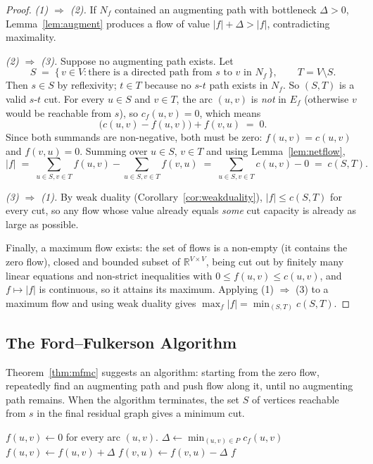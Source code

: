 \documentclass{article}
\theoremstyle{definition}
\begin{document}
\begin{proof}
\emph{(1) $\Rightarrow$ (2).} If $N_f$ contained an augmenting path
with bottleneck $\Delta > 0$, Lemma~\ref{lem:augment} produces a flow
of value $|f| + \Delta > |f|$, contradicting maximality.

\emph{(2) $\Rightarrow$ (3).} Suppose no augmenting path exists. Let
\[
  S \;=\; \{\, v \in V : \text{there is a directed path from } s \text{ to } v \text{ in } N_f \,\},
  \qquad T = V \setminus S.
\]
Then $s \in S$ by reflexivity; $t \in T$ because no $s$-$t$ path
exists in $N_f$. So $(S, T)$ is a valid $s$-$t$ cut. For every
$u \in S$ and $v \in T$, the arc $(u, v)$ is \emph{not} in $E_f$
(otherwise $v$ would be reachable from $s$), so $c_f(u, v) = 0$,
which means
\[
  \big(c(u, v) - f(u, v)\big) + f(v, u) \;=\; 0.
\]
Since both summands are non-negative, both must be zero:
$f(u, v) = c(u, v)$ and $f(v, u) = 0$. Summing over $u \in S$,
$v \in T$ and using Lemma~\ref{lem:netflow},
\[
  |f| \;=\; \sum_{u \in S, v \in T} f(u, v) - \sum_{u \in S, v \in T} f(v, u)
       \;=\; \sum_{u \in S, v \in T} c(u, v) - 0
       \;=\; c(S, T).
\]

\emph{(3) $\Rightarrow$ (1).} By weak duality
(Corollary~\ref{cor:weakduality}), $|f| \le c(S, T)$ for every cut,
so any flow whose value already equals \emph{some} cut capacity is
already as large as possible.

Finally, a maximum flow exists: the set of flows is a non-empty (it
contains the zero flow), closed and bounded subset of
$\mathbb{R}^{V \times V}$, being cut out by finitely many linear
equations and non-strict inequalities with $0 \le f(u, v) \le c(u, v)$,
and $f \mapsto |f|$ is continuous, so it attains its maximum. Applying
(1) $\Rightarrow$ (3) to a maximum flow and using weak duality gives
$\max_f |f| = \min_{(S, T)} c(S, T)$.
\end{proof}

\subsection{The Ford--Fulkerson Algorithm}

Theorem~\ref{thm:mfmc} suggests an algorithm: starting from the zero
flow, repeatedly find an augmenting path and push flow along it,
until no augmenting path remains. When the algorithm terminates, the
set $S$ of vertices reachable from $s$ in the final residual graph
gives a minimum cut.

\begin{algorithm}
\caption{Ford--Fulkerson}
\begin{algorithmic}[1]
\State $f(u, v) \gets 0$ for every arc $(u, v)$.
  \State $\Delta \gets \min_{(u, v) \in P} c_f(u, v)$
     $f(u, v) \gets f(u, v) + \Delta$
    \Else{ } $f(v, u) \gets f(v, u) - \Delta$
    \EndIf
  \EndFor
\EndWhile
\State \Return $f$
\end{algorithmic}
\end{algorithm}
\end{document}
